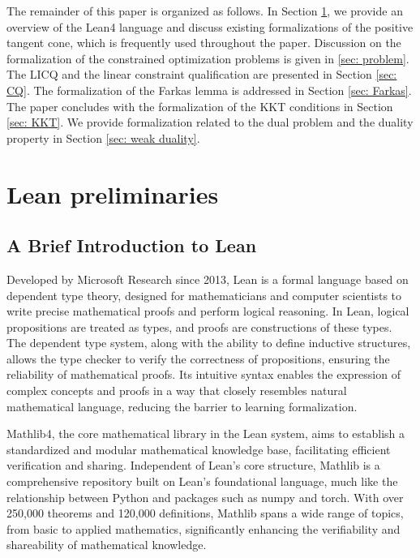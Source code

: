 \documentclass[sn-mathphys]{JORSC-jnl}%
\theoremstyle{thmstyleone}%
\theoremstyle{thmstylethree}%
\begin{document}
The remainder of this paper is organized as follows. In Section \ref{sec: lean-pre}, we provide an overview of the Lean4 language and discuss existing formalizations of the positive tangent cone, which is frequently used throughout the paper. Discussion on the formalization of the constrained optimization problems is given in \ref{sec: problem}. The LICQ and the linear constraint qualification are presented in Section \ref{sec: CQ}. The formalization of the Farkas lemma is addressed in Section \ref{sec: Farkas}. The paper concludes with the formalization of the KKT conditions in Section \ref{sec: KKT}. We provide formalization related to the dual problem and the duality property in Section \ref{sec: weak duality}.

\section{Lean preliminaries}\label{sec: lean-pre}
\subsection{A Brief Introduction to Lean}
Developed by Microsoft Research since 2013, Lean is a formal language based on dependent type theory, designed for mathematicians and computer scientists to write precise mathematical proofs and perform logical reasoning. In Lean, logical propositions are treated as types, and proofs are constructions of these types. The dependent type system, along with the ability to define inductive structures, allows the type checker to verify the correctness of propositions, ensuring the reliability of mathematical proofs. Its intuitive syntax enables the expression of complex concepts and proofs in a way that closely resembles natural mathematical language, reducing the barrier to learning formalization.

Mathlib4, the core mathematical library \cite{mathlibcommunity} in the Lean system, aims to establish a standardized and modular mathematical knowledge base, facilitating efficient verification and sharing. Independent of Lean's core structure, Mathlib is a comprehensive repository built on Lean’s foundational language, much like the relationship between Python and packages such as numpy and torch. With over 250,000 theorems and 120,000 definitions, Mathlib spans a wide range of topics, from basic to applied mathematics, significantly enhancing the verifiability and shareability of mathematical knowledge.
\end{document}
